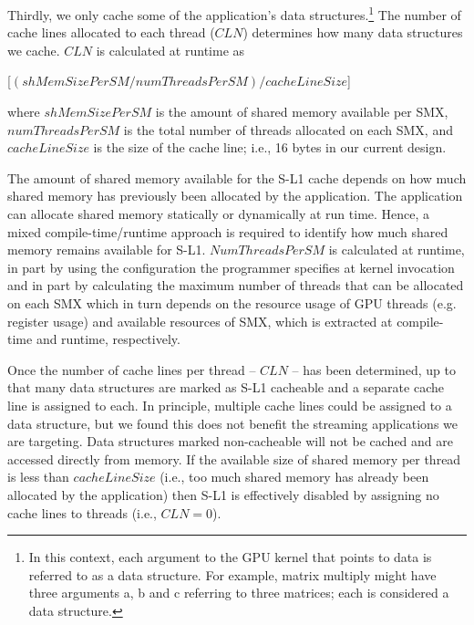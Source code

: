
Thirdly, we only cache some of the application's data structures.\footnote{
    In this context, each argument to the GPU kernel that points to data is referred to as a data structure. 
    For example, matrix multiply might have three arguments a, b and c referring to three matrices;
    each is considered a data structure.}
The number of cache lines allocated to each thread ($CLN$) determines how many data structures we cache.
$CLN$ is calculated at runtime as
\begin{center} 
[$(shMemSizePerSM / numThreadsPerSM) / cacheLineSize$]
\end{center}
where $shMemSizePerSM$ is the amount of shared memory available per SMX, $numThreadsPerSM$ is the
total number of threads allocated on each SMX, and $cacheLineSize$ is the size of the cache line;
i.e., 16 bytes in our current design. 

The amount of shared memory available for the S-L1 cache depends on how much shared memory has previously been allocated by the application.
The application can allocate shared memory statically or dynamically at run time.
Hence, a mixed compile-time/runtime approach is required to identify how much shared memory remains available for S-L1.
$NumThreadsPerSM$ is calculated at runtime, in part by using the configuration
the programmer specifies at kernel invocation
and in part by calculating the maximum number of threads that can be allocated on each SMX which in
turn depends on the resource usage of GPU threads (e.g. register usage) and available
resources of SMX, which is extracted at compile-time and runtime, respectively.

Once the number of cache lines per thread -- $CLN$ -- has been determined, up to that many data structures are marked as S-L1 cacheable and a separate cache line is assigned to each.
In principle, multiple cache lines could be assigned to a data structure, but we found this does not benefit the streaming applications we are targeting.
Data structures marked non-cacheable will not be cached and are accessed directly from memory. 
If the available size of shared memory per thread is less than $cacheLineSize$ (i.e., too much shared memory has already been allocated by the application) then S-L1 is effectively disabled by assigning no cache lines to threads (i.e., $CLN = 0$). 

